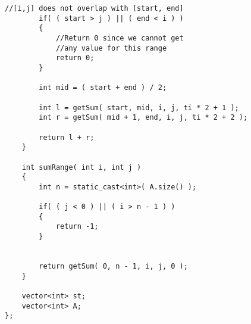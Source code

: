 \begin{lstlisting}[style=customc, caption={Solution Code With Segment Tree}]
        //[i,j] does not overlap with [start, end]
        if( ( start > j ) || ( end < i ) )
        {
            //Return 0 since we cannot get
            //any value for this range
            return 0;
        }

        int mid = ( start + end ) / 2;

        int l = getSum( start, mid, i, j, ti * 2 + 1 );
        int r = getSum( mid + 1, end, i, j, ti * 2 + 2 );

        return l + r;
    }

    int sumRange( int i, int j )
    {
        int n = static_cast<int>( A.size() );

        if( ( j < 0 ) || ( i > n - 1 ) )
        {
            return -1;
        }


        return getSum( 0, n - 1, i, j, 0 );
    }

    vector<int> st;
    vector<int> A;
};

\end{lstlisting}
